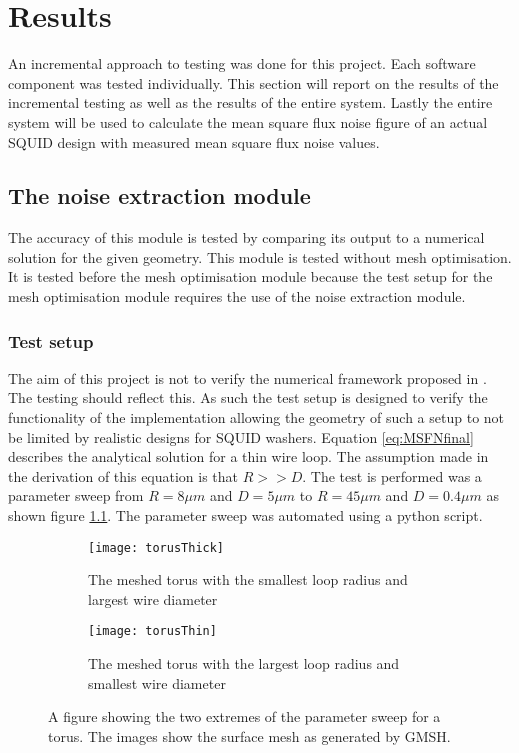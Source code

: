 \graphicspath{{results/fig/}}

\chapter{Results}
\label{chap:results}
An incremental approach to testing was done for this project. Each software component was tested individually. This section will report on the results of the incremental testing as well as the results of the entire system. Lastly the entire system will be used to calculate the mean square flux noise figure of an actual SQUID design with measured mean square flux noise values.

\section{The noise extraction module}
The accuracy of this module is tested by comparing its output to a numerical solution for the given geometry. This module is tested without mesh optimisation. It is tested before the mesh optimisation module because the test setup for the mesh optimisation module requires the use of the noise extraction module.
\subsection{Test setup}
The aim of this project is not to verify the numerical framework proposed in \cite{fluxNoiseSquidsStevenAnton}. The testing should reflect this. As such the test setup is designed to verify the functionality of the implementation allowing the geometry of such a setup to not be limited by realistic designs for SQUID washers. Equation \ref{eq:MSFNfinal} describes the analytical solution for a thin wire loop. The assumption made in the derivation of this equation is that $R >> D$. The test is performed was a parameter sweep from $R = \si{8}{\mu m}$ and $D = \si{5}{\mu m}$ to $R = \si{45}{\mu m}$ and $D = \si{0.4}{\mu m}$ as shown figure \ref{fig:meshedTorus}. The parameter sweep was automated using a python script.

\begin{figure}[h]
    \centering
    \begin{subfigure}[b]{0.45\textwidth}
        \centering
        \texttt{[image: torusThick]}
        \caption{The meshed torus with the smallest loop radius and largest wire diameter}
    \end{subfigure}
    \hfill
    \begin{subfigure}[b]{0.45\textwidth}
        \centering
        \texttt{[image: torusThin]}
        \caption{The meshed torus with the largest loop radius and smallest wire diameter}
    \end{subfigure}
    \caption{A figure showing the two extremes of the parameter sweep for a torus. The images show the surface mesh as generated by GMSH.}
    \label{fig:meshedTorus}
\end{figure}
